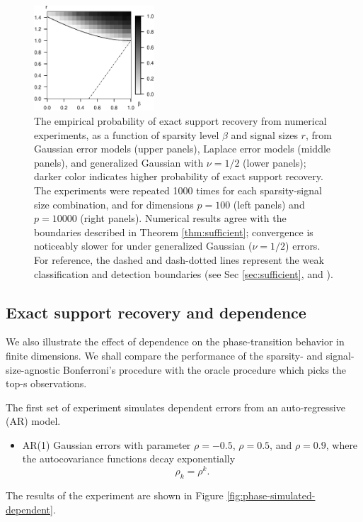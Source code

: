 \begin{figure}
      \includegraphics[width=0.4\textwidth]{./figures/simulated_phase_diagram_NLC_p10000.eps}
      \caption{The empirical probability of exact support recovery from numerical experiments, as a function of sparsity level $\beta$ and signal sizes $r$, from Gaussian error models (upper panels), Laplace error models (middle panels), and generalized Gaussian with $\nu=1/2$ (lower panels); darker color indicates higher probability of exact support recovery. 
      The experiments were repeated 1000 times for each sparsity-signal size combination, and for dimensions $p=100$ (left panels) and $p=10000$ (right panels). Numerical results agree with the boundaries described in Theorem \ref{thm:sufficient}; convergence is noticeably slower for under generalized Gaussian ($\nu=1/2$) errors.
      For reference, the dashed and dash-dotted lines represent the weak classification and detection boundaries (see Sec \ref{sec:sufficient}, and \citep{haupt2011distilled, arias2017distribution, ingster1998minimax, donoho2004higher}).}
      \label{fig:phase-simulated}
\end{figure}

\subsection{Exact support recovery and dependence}

We also illustrate the effect of dependence on the phase-transition behavior in finite dimensions.
We shall compare the performance of the sparsity- and signal-size-agnostic Bonferroni's procedure with the oracle procedure which picks the top-s observations.

The first set of experiment simulates dependent errors from an auto-regressive (AR) model.
\begin{itemize}
    \item AR(1) Gaussian errors with parameter $\rho = -0.5$, $\rho = 0.5$, and $\rho = 0.9$,
    where the autocovariance functions decay exponentially
    $$\rho_{k} = \rho^{k}.$$
\end{itemize}
The results of the experiment are shown in Figure \ref{fig:phase-simulated-dependent}.

